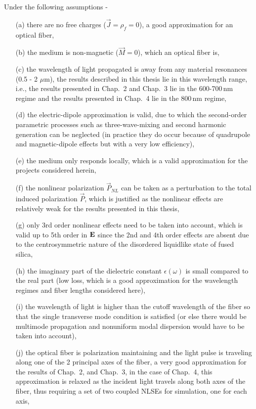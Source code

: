 Under the following assumptions \cite{Agrawal2} -
\begin{enumerate}
\item[(a)]
there are no free charges ($\vec{J}=\rho_{f}=0$), a good approximation for an optical fiber,
\item[(b)] the medium is non-magnetic ($\vec{M}=0$), which an optical fiber is,
\item[(c)] the wavelength of light propagated is away from any material
resonances (0.5 - 2 $\mu$m), the results described in this thesis lie in this wavelength range, i.e., the results presented in Chap.\ 2 and Chap.\ 3 lie in the 600-700\,nm regime and the results presented in Chap.\ 4 lie in the 800\,nm regime,
\item[(d)] the electric-dipole approximation is valid, due to which the second-order parametric processes such as three-wave-mixing and second harmonic generation can be neglected (in practice they do occur because of quadrupole and magnetic-dipole effects but with a very low efficiency),
\item[(e)] the medium only responds locally, which is a valid approximation for the projects considered herein,
\item[(f)] the nonlinear polarization $\vec{P}_{NL}$ can be taken as a
perturbation to the total induced polarization $\vec{P}$, which is justified as the nonlinear effects are relatively weak for the results presented in this thesis,
\item[(g)] only 3rd order nonlinear effects need to be taken into
account, which is valid up to 5th order in ${\bf E}$ since the 2nd and 4th order effects are absent due to the centrosymmetric nature of the disordered liquidlike state of fused silica,
\item[(h)] the imaginary part of the dielectric constant
$\epsilon(\omega)$ is small compared to the real part (low loss, which is a good approximation for the wavelength regimes and fiber lengths considered here),
\item[(i)] the wavelength of light is higher than the cutoff wavelength
of the fiber so that the single transverse mode condition is satisfied (or else there would be multimode propagation and nonuniform modal dispersion would have to be taken into account),
\item[(j)] the optical fiber is polarization maintaining and the light
pulse is traveling along one of the 2 principal axes of the fiber, a very good approximation for the results of Chap.\ 2, and Chap.\ 3, in the case of Chap.\ 4, this approximation is relaxed as the incident light travels along both axes of the fiber, thus requiring a set of two coupled NLSEs for simulation, one for each axis,

\end{enumerate}
